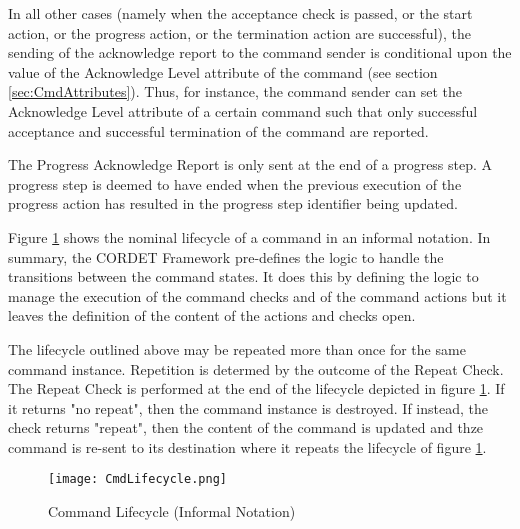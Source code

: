 In all other cases (namely when the acceptance check is passed, or the start action, or the progress action, or the termination action are successful), the sending of the acknowledge report to the command sender is conditional upon the value of the Acknowledge Level attribute of the command (see section \ref{sec:CmdAttributes}). Thus, for instance, the command sender can set the Acknowledge Level attribute of a certain command such that only successful acceptance and successful termination of the command are reported. 

The Progress Acknowledge Report is only sent at the end of a progress step. A progress step is deemed to have ended when the previous execution of the progress action has resulted in the progress step identifier being updated.

Figure \ref{fig:CmdLifecycle} shows the nominal lifecycle of a command in an informal notation. In summary, the CORDET Framework pre-defines the logic to handle the transitions between the command states. It does this by defining the logic to manage the execution of the command checks and of the command actions but it leaves the definition of the content of the actions and checks open. 

The lifecycle outlined above may be repeated more than once for the same command instance. Repetition is determed by the outcome of the Repeat Check. The Repeat Check is performed at the end of the lifecycle depicted in figure \ref{fig:CmdLifecycle}. If it returns "no repeat", then the command instance is destroyed. If instead, the check returns "repeat", then the content of the command is updated and thze command is re-sent to its destination where it repeats the lifecycle of figure \ref{fig:CmdLifecycle}.

\begin{figure}[ht]
 \centering
 \texttt{[image: CmdLifecycle.png]}
 \caption{Command Lifecycle (Informal Notation)}
 \label{fig:CmdLifecycle}
\end{figure}


